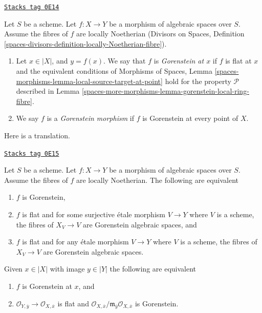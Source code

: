 \begin{definition}[Gorenstein]
\label{spaces-more-morphisms-definition-gorenstein}
\href{https://stacks.math.columbia.edu/tag/0E14}{\texttt{Stacks tag 0E14}}

Let $S$ be a scheme.
Let $f : X \to Y$ be a morphism of algebraic spaces over $S$.
Assume the fibres of $f$ are locally Noetherian
(Divisors on Spaces, Definition
\ref{spaces-divisors-definition-locally-Noetherian-fibre}).
\begin{enumerate}
\item Let $x \in |X|$, and $y = f(x)$. We say that $f$ is
{\it Gorenstein at $x$} if $f$ is flat at $x$ and
the equivalent conditions of
Morphisms of Spaces, Lemma
\ref{spaces-morphisms-lemma-local-source-target-at-point}
hold for the property $\mathcal{P}$ described in
Lemma \ref{spaces-more-morphisms-lemma-gorenstein-local-ring-fibre}.
\item We say $f$ is a {\it Gorenstein morphism} if $f$ is
Gorenstein at every point of $X$.
\end{enumerate}
\end{definition}

Here is a translation.

\begin{lemma}[Gorenstein]
\label{spaces-more-morphisms-lemma-gorenstein}
\href{https://stacks.math.columbia.edu/tag/0E15}{\texttt{Stacks tag 0E15}}

Let $S$ be a scheme. Let $f : X \to Y$ be a morphism of algebraic spaces
over $S$. Assume the fibres of $f$ are locally Noetherian.
The following are equivalent
\begin{enumerate}
\item $f$ is Gorenstein,
\item $f$ is flat and for some surjective \'etale morphism $V \to Y$
where $V$ is a scheme, the fibres of $X_V \to V$
are Gorenstein algebraic spaces, and
\item $f$ is flat and for any \'etale morphism $V \to Y$
where $V$ is a scheme, the fibres of $X_V \to V$
are Gorenstein algebraic spaces.
\end{enumerate}
Given $x \in |X|$ with image $y \in |Y|$ the following are
equivalent
\begin{enumerate}
\item[(a)] $f$ is Gorenstein at $x$, and
\item[(b)] $\mathcal{O}_{Y, \overline{y}} \to \mathcal{O}_{X, \overline{x}}$
is flat and
$\mathcal{O}_{X, \overline{x}}/
\mathfrak m_{\overline{y}}\mathcal{O}_{X, \overline{x}}$ is Gorenstein.
\end{enumerate}
\end{lemma}

